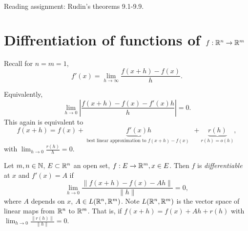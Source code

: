 \begin{thm}
\begin{remark}
\begin{enumerate}
		\end{enumerate}
		\item Reading assignment: Rudin's theorems 9.1-9.9.
	\end{remark}
\end{thm}

\section{Diffrentiation of functions of $f: \mathbb{R}^{n} \to \mathbb{R}^{m}$}

Recall for $n=m=1$,
\[
	f'(x)=\lim_{h\to \infty}{\frac{f(x+h)-f(x)}{h}}
	.\]

Equivalently, \[
	\lim_{h\to 0}{\left|\frac{f(x+h)-f(x)-f'(x)h}{h}\right|}=0
	.\]
This again is equivalent to
\[
	f(x+h)=f(x)+\underbrace{f'(x) h}_{\text{ best linear approximation to $f(x+h)-f(x)$ } }+\underbrace{r(h)}_{r(h)=o(h)}
	,\]
with $\lim_{h\to 0}{\frac{r(h)}{h}}=0$.


\begin{define}[11]
	Let $m,n \in \mathbb{N}$, $E \subset \mathbb{R}^{n}$ an open set, $f: E\to \mathbb{R}^{m}, x \in E$.
	Then $f$ is \textit{differentiable} at $x$ and $f'(x)=A$ if
	\[
		\lim_{h\to 0}{\frac{\|f(x+h)-f(x)-Ah\|}{\|h\|}}=0
		,\] where $A$ depends on $x$, $A \in L(\mathbb{R}^{n},\mathbb{R}^{m})$.
	Note $L(\mathbb{R}^{n},\mathbb{R}^{m})$ is the vector space of linear maps from $\mathbb{R}^{n}$ to $\mathbb{R}^{m}$.
	That is, if $f(x+h)=f(x)+Ah+r(h)$ with $\lim_{h\to 0}{\frac{\|r(h)\|}{\|h\|}}=0$.
\end{define}


